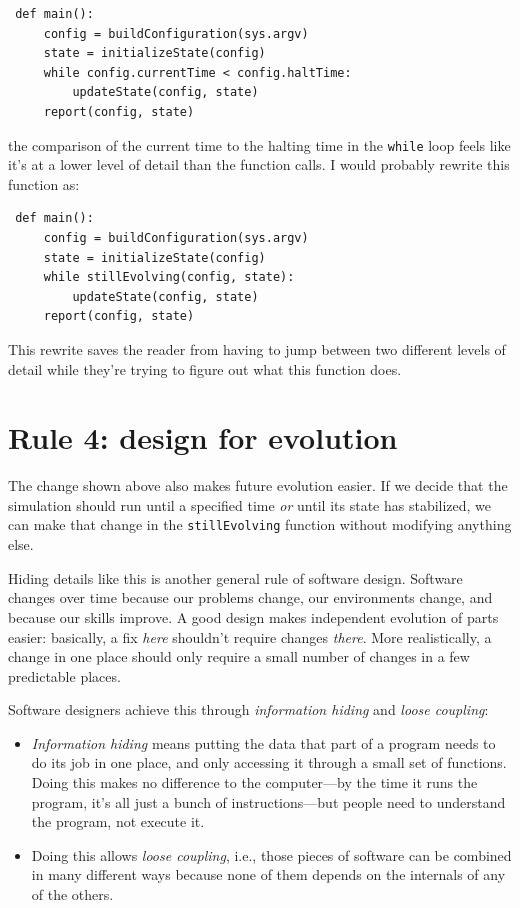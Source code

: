 \documentclass[10pt,letterpaper]{article}
\begin{document}
\begin{verbatim}
 def main():
     config = buildConfiguration(sys.argv)
     state = initializeState(config)
     while config.currentTime < config.haltTime:
         updateState(config, state)
     report(config, state)
\end{verbatim}

\noindent
the comparison of the current time to the halting time in the \texttt{while} loop
feels like it's at a lower level of detail than the function calls.
I would probably rewrite this function as:

\begin{verbatim}
 def main():
     config = buildConfiguration(sys.argv)
     state = initializeState(config)
     while stillEvolving(config, state):
         updateState(config, state)
     report(config, state)
\end{verbatim}

\noindent
This rewrite saves the reader
from having to jump between two different levels of detail
while they're trying to figure out what this function does.

\section*{Rule 4: design for evolution}

The change shown above also makes future evolution easier.
If we decide that the simulation should run until a specified time
\emph{or} until its state has stabilized,
we can make that change in the \texttt{stillEvolving} function
without modifying anything else.

Hiding details like this is another general rule of software design.
Software changes over time because our problems change,
our environments change,
and because our skills improve.
A good design makes independent evolution of parts easier:
basically,
a fix \emph{here} shouldn't require changes \emph{there}.
More realistically,
a change in one place should only require a small number of changes
in a few predictable places.

Software designers achieve this through \emph{information hiding}
and \emph{loose coupling}:

\begin{itemize}

\item
  \emph{Information hiding} means
  putting the data that part of a program needs to do its job in one place,
  and only accessing it through a small set of functions.
  Doing this makes no difference to the computer---by the time it runs the program,
  it's all just a bunch of instructions---but
  people need to understand the program,
  not execute it.

\item
  Doing this allows \emph{loose coupling},
  i.e.,
  those pieces of software can be combined in many different ways
  because none of them depends on the internals of any of the others.

\end{itemize}
\end{document}
